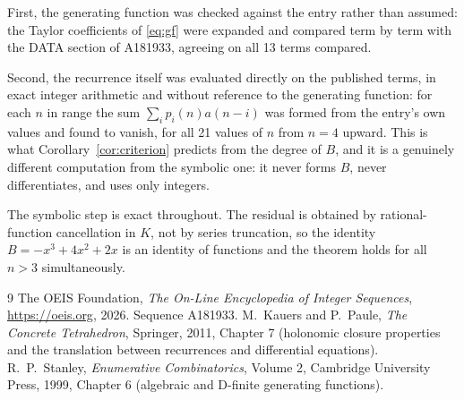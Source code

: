 \documentclass[11pt,a4paper]{article}
\theoremstyle{plain}
\theoremstyle{definition}
\begin{document}
First, the generating function was checked against the entry rather than assumed: the
Taylor coefficients of \eqref{eq:gf} were expanded and compared term by term with the DATA
section of A181933, agreeing on all 13 terms compared.

Second, the recurrence itself was evaluated directly on the published terms, in exact
integer arithmetic and without reference to the generating function: for each $n$ in range
the sum $\sum_{i}p_{i}(n)a(n-i)$ was formed from the entry's own values and found to
vanish, for all 21 values of $n$ from $n=4$ upward. This is what
Corollary~\ref{cor:criterion} predicts from the degree of $B$, and it is a genuinely
different computation from the symbolic one: it never forms $B$, never differentiates, and
uses only integers.

The symbolic step is exact throughout. The residual is obtained by rational-function
cancellation in $K$, not by series truncation, so the identity $B=- x^{3} + 4 x^{2} + 2 x$ is an
identity of functions and the theorem holds for all $n>3$ simultaneously.

\begin{thebibliography}{9}
 The OEIS Foundation, \emph{The On-Line Encyclopedia of Integer Sequences},
\url{https://oeis.org}, 2026. Sequence A181933.
 M.~Kauers and P.~Paule, \emph{The Concrete Tetrahedron}, Springer, 2011,
Chapter 7 (holonomic closure properties and the translation between recurrences and
differential equations).
 R.~P.~Stanley, \emph{Enumerative Combinatorics}, Volume 2, Cambridge
University Press, 1999, Chapter 6 (algebraic and D-finite generating functions).
\end{thebibliography}
\end{document}
